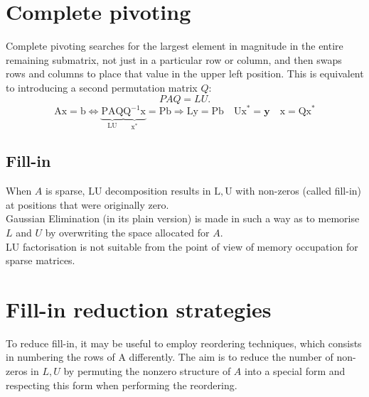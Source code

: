 \documentclass[11pt]{book}
\begin{document}
\section*{Complete pivoting}
 Complete pivoting searches for the largest element in magnitude in the entire remaining submatrix, not just in a particular row or column, and then swaps rows and columns to place that value in the upper left position. This is equivalent to introducing a second permutation matrix $Q$:
$$
PA Q=LU.
$$
$$
\mathrm{Ax}=\mathrm{b} \Leftrightarrow \underbrace{\mathrm{PAQ}}_{\mathrm{LU}} \underbrace{\mathrm{Q}^{-1} \mathrm{x}}_{\mathrm{x}^{*}}=\mathrm{Pb} \Longrightarrow \mathrm{Ly}=\mathrm{Pb} \quad \mathrm{Ux}^{*}=\mathbf{y} \quad \mathrm{x}=\mathrm{Qx}^{*}
$$

\subsection*{Fill-in}
When $A$ is sparse, $\mathrm{LU}$ decomposition results in $\mathrm{L}, \mathrm{U}$ with non-zeros (called fill-in) at positions that were originally zero.\\
Gaussian Elimination (in its plain version) is made in such a way as to memorise $L$ and $U$ by overwriting the space allocated for $A$.\\
LU factorisation is not suitable from the point of view of memory occupation for sparse matrices.

\section*{Fill-in reduction strategies}
To reduce fill-in, it may be useful to employ reordering techniques, which consists in numbering the rows of A differently. The aim is to reduce the number of non-zeros in $L, U$ by permuting the nonzero structure of $A$ into a special form and respecting this form when performing the reordering.
\end{document}
